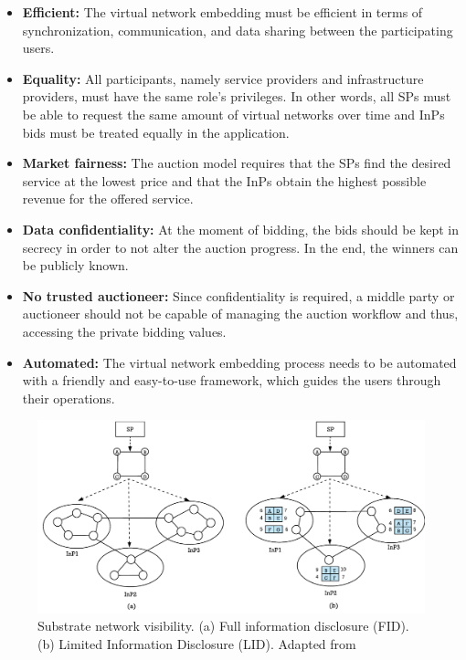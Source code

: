 \begin{itemize}
    \item \textbf{Efficient:} The virtual network embedding must be efficient in terms of synchronization, communication, and data sharing between the participating users.
    \item \textbf{Equality:} All participants, namely service providers and infrastructure providers, must have the same role's privileges. In other words, all SPs must be able to request the same amount of virtual networks over time and InPs bids must be treated equally in the application.
    \item \textbf{Market fairness:} The auction model requires that the SPs find the desired service at the lowest price and that the InPs obtain the highest possible revenue for the offered service.
    \item \textbf{Data confidentiality:} At the moment of bidding, the bids should be kept in secrecy in order to not alter the auction progress. In the end, the winners can be publicly known.
    \item \textbf{No trusted auctioneer:} Since confidentiality is required, a middle party or auctioneer should not be capable of managing the auction workflow and thus, accessing the private bidding values.
     \item \textbf{Automated:} The virtual network embedding process needs to be automated with a friendly and easy-to-use framework, which guides the users through their operations. 
\end{itemize}

\begin{figure}[bth]
	\centering
	\includegraphics[width=1\linewidth]{gfx/Problem}    
  	\caption{Substrate network visibility. (a) Full information disclosure (FID). (b) Limited Information Disclosure (LID). Adapted from \citep{dietrich2015multi}}
  	\label{fig:problem}
\end{figure}

